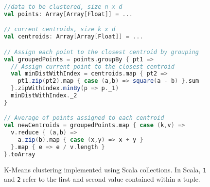 




\begin{figure}\centering
\begin{lstlisting}[language=Scala]
//data to be clustered, size n x d
val points: Array[Array[Float]] = ...

// current centroids, size k x d
val centroids: Array[Array[Float]] = ...

// Assign each point to the closest centroid by grouping
val groupedPoints = points.groupBy { pt1 =>
  // Assign current point to the closest centroid
  val minDistWithIndex = centroids.map { pt2 =>
    pt1.zip(pt2).map { case (a,b) => square(a - b) }.sum
  }.zipWithIndex.minBy(p => p._1)
  minDistWithIndex._2
}

// Average of points assigned to each centroid
val newCentroids = groupedPoints.map { case (k,v) =>
  v.reduce { (a,b) =>
    a.zip(b).map { case (x,y) => x + y }
  }.map { e => e / v.length }
}.toArray
\end{lstlisting}
\caption{K-Means clustering implemented using Scala collections. In Scala, \textunderscore\texttt{1} and \textunderscore\texttt{2} refer to the first and second value contained within a tuple.}
\label{fig:kmeans}
\end{figure}

